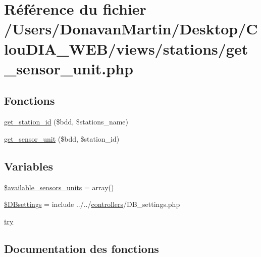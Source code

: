 \hypertarget{get__sensor__unit_8php}{}\section{Référence du fichier /\+Users/\+Donavan\+Martin/\+Desktop/\+Clou\+D\+I\+A\+\_\+\+W\+E\+B/views/stations/get\+\_\+sensor\+\_\+unit.php}
\label{get__sensor__unit_8php}
\subsection*{Fonctions}
\begin{DoxyCompactItemize}
\item 
\hyperlink{get__sensor__unit_8php_a5fcaf0efa9e726d33953efc2533629a1}{get\+\_\+station\+\_\+id} (\$bdd, \$stations\+\_\+name)
\item 
\hyperlink{get__sensor__unit_8php_a2e491fcdb26023f658e6309d7dea468a}{get\+\_\+sensor\+\_\+unit} (\$bdd, \$station\+\_\+id)
\end{DoxyCompactItemize}
\subsection*{Variables}
\begin{DoxyCompactItemize}
\item 
\hyperlink{get__sensor__unit_8php_a002e9ee8a646d4715cdd6dc730ee762b}{\$available\+\_\+sensors\+\_\+units} = array()
\item 
\hyperlink{get__sensor__unit_8php_a9d97b484ee351b8e6034d74504996e9f}{\$\+D\+Bsettings} = include \textquotesingle{}../../\hyperlink{index_8js_ae15548a4836771e65070b7b408b2d46a}{controllers}/D\+B\+\_\+settings.\+php\textquotesingle{}
\item 
\hyperlink{get__sensor__unit_8php_abe4cc9788f52e49485473dc699537388}{try}
\end{DoxyCompactItemize}


\subsection{Documentation des fonctions}
\hypertarget{get__sensor__unit_8php_a2e491fcdb26023f658e6309d7dea468a}{}

